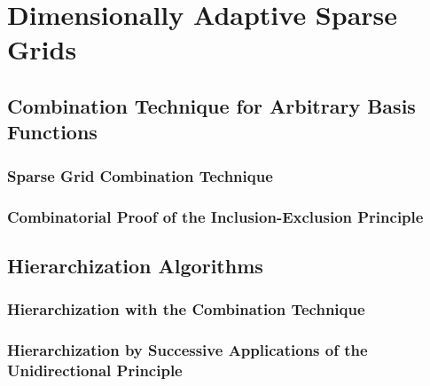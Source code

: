 \section{Dimensionally Adaptive Sparse Grids}


\subsection{Combination Technique for Arbitrary Basis Functions}


\subsubsection{Sparse Grid Combination Technique}


\subsubsection{Combinatorial Proof of the Inclusion-Exclusion Principle}


\subsection{Hierarchization Algorithms}


\subsubsection{Hierarchization with the Combination Technique}


\subsubsection{%
  Hierarchization by Successive Applications of the Unidirectional Principle%
}

